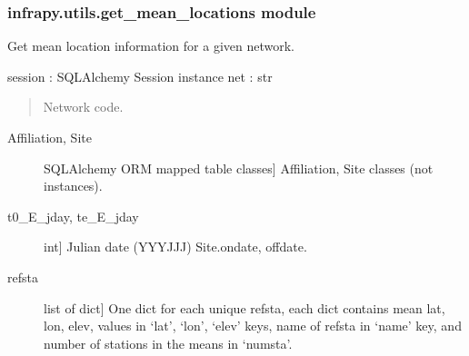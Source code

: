 \documentclass[letterpaper,10pt,english]{sphinxmanual}
\begin{document}
\begin{fulllineitems}
\label{\detokenize{infrapy.utils:infrapy.utils.get_header_table.get_header_table}}
\end{fulllineitems}



\subsubsection{infrapy.utils.get\_mean\_locations module}
\label{\detokenize{infrapy.utils:module-infrapy.utils.get_mean_locations}}\label{\detokenize{infrapy.utils:infrapy-utils-get-mean-locations-module}}

\begin{fulllineitems}
\label{\detokenize{infrapy.utils:infrapy.utils.get_mean_locations.get_mean_locations}}
Get mean location information for a given network.

session : SQLAlchemy Session instance
net : str
\begin{quote}

Network code.
\end{quote}
\begin{description}
\item[{Affiliation, Site}] \leavevmode{[}SQLAlchemy ORM mapped table classes{]}
Affiliation, Site classes (not instances).

\item[{t0\_E\_jday, te\_E\_jday}] \leavevmode{[}int{]}
Julian date (YYYJJJ) Site.ondate, offdate.

\end{description}
\begin{description}
\item[{refsta}] \leavevmode{[}list of dict{]}
One dict for each unique refsta, each dict contains mean lat, lon,
elev, values in ‘lat’, ‘lon’, ‘elev’ keys, name of refsta in ‘name’
key, and number of stations in the means in ‘numsta’.

\end{description}

\end{fulllineitems}
\end{document}

